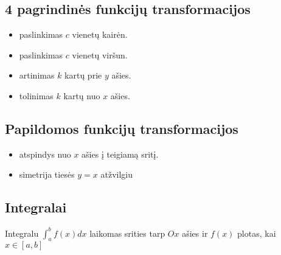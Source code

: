 \documentclass{article}
\begin{document}
\subsection{4 pagrindinės funkcijų transformacijos}
\begin{itemize}
\item {} paslinkimas $c$ vienetų kairėn. 
\item {} paslinkimas $c$ vienetų viršun. 
\item {} artinimas $k$ kartų prie $y$ ašies. 
\item {} tolinimas $k$ kartų nuo $x$ ašies. 
\end{itemize}

\subsection{Papildomos funkcijų transformacijos}
\begin{itemize}
\item {} atspindys nuo $x$ ašies į teigiamą sritį.
\item {} simetrija tiesės $y=x$ atžvilgiu
\end{itemize}

\subsection{Integralai}

Integralu $\displaystyle \int_a^b f(x)dx$ laikomas srities tarp $Ox$ ašies ir $f(x)$ plotas, kai $x \in [a,b]$ 

\begin{comment}
\newpage
\hyperlink{pirmyn}{
\begin{tikzpicture}
\node[rectangle, draw=black, fill=blue!30, rounded corners=.2cm] (atgal) {\hypertarget{atgal}{\textbf{BACK}}};
\end{tikzpicture}}

\newpage
\hyperlink{antryn}{
\begin{tikzpicture}
\node[rectangle, draw=black, fill=blue!30, rounded corners=.2cm] (atgal2) {\hypertarget{atgal2}{\textbf{BACK}}};
\end{tikzpicture}}
\end{comment}
\end{document}
